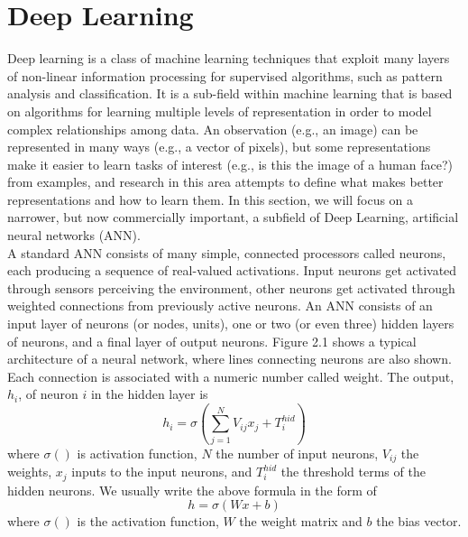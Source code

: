 \documentclass[12pt]{report} %
\begin{document}
\section{Deep Learning}
Deep learning is a class of machine learning techniques that exploit many layers of non-linear information processing for supervised algorithms, such as pattern analysis and classification. It is a sub-field within machine learning that is based on algorithms for learning multiple levels of representation in order to model complex relationships among data. An observation (e.g., an image) can be represented in many ways (e.g., a vector of pixels), but some representations make it easier to learn tasks of interest (e.g.,
is this the image of a human face?) from examples, and research in this area attempts to define what makes better representations and how to learn them\cite{DL}. In this section, we will focus on a narrower, but now commercially important, a subfield of Deep Learning,  artificial neural networks (ANN).\\
A standard ANN consists of many simple, connected processors called neurons, each producing a sequence of real-valued activations. Input neurons get activated through sensors perceiving the environment, other neurons get activated through weighted connections from previously active neurons\cite{NN}. An ANN consists of an input layer of neurons (or nodes, units), one or two (or even three) hidden layers of neurons, and a final layer of output neurons. Figure 2.1 shows a typical architecture of a neural network, where lines connecting neurons are also shown. Each connection is associated with a numeric number called weight. The output, $h_{i}$, of neuron $i$ in the hidden layer is
\begin{equation}
h_{i}=\sigma(\sum _{j=1}^{N}V_{ij}x_{j}+T_{i}^{hid})
\end{equation}
where $\sigma()$ is activation function, $N$ the number of input neurons,  $V_{ij}$ the weights, $x_{j}$ inputs to the input neurons, and $T_{i}^{hid}$ the threshold terms of the hidden neurons\cite{NN2}. We usually write the above formula in the form of
\begin{equation}
h=\sigma(Wx+b)
\end{equation}
where $\sigma()$ is the activation function, $W$ the weight matrix and $b$ the bias vector.
\end{document}
